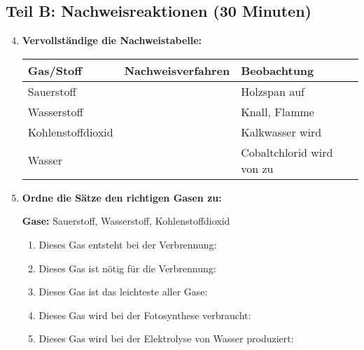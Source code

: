 \subsection*{Teil B: Nachweisreaktionen (30 Minuten)}

\begin{enumerate}[label=\arabic*.]
    \setcounter{enumi}{3}

    \item \textbf{Vervollständige die Nachweistabelle:}
    \vspace{0.5cm}

    \begin{tabular}{|p{3cm}|p{4cm}|p{4cm}|}
        \hline
        \textbf{Gas/Stoff} & \textbf{Nachweisverfahren} & \textbf{Beobachtung} \\
        \hline
        Sauerstoff & \underline{\hspace{3cm}} & Holzspan \underline{\hspace{2cm}} auf \\
        \hline
        Wasserstoff & \underline{\hspace{3cm}} & Knall, \underline{\hspace{2cm}} Flamme \\
        \hline
        Kohlenstoffdioxid & \underline{\hspace{3cm}} & Kalkwasser wird \underline{\hspace{2cm}} \\
        \hline
        Wasser & \underline{\hspace{3cm}} & Cobaltchlorid wird von \underline{\hspace{1cm}} zu \underline{\hspace{1cm}} \\
        \hline
    \end{tabular}

    \vspace{1cm}

    \item \textbf{Ordne die Sätze den richtigen Gasen zu:}
    \vspace{0.5cm}

    \textbf{Gase:} Sauerstoff, Wasserstoff, Kohlenstoffdioxid

    \begin{enumerate}[label=\alph*)]
        \item Dieses Gas entsteht bei der Verbrennung: \underline{\hspace{3cm}}
        \item Dieses Gas ist nötig für die Verbrennung: \underline{\hspace{3cm}}
        \item Dieses Gas ist das leichteste aller Gase: \underline{\hspace{3cm}}
        \item Dieses Gas wird bei der Fotosynthese verbraucht: \underline{\hspace{3cm}}
        \item Dieses Gas wird bei der Elektrolyse von Wasser produziert: \underline{\hspace{3cm}}
    \end{enumerate}


\end{enumerate}
